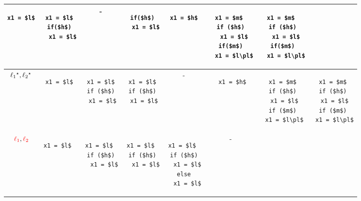 \begin{table*}
\begin{tabular} {|c|c|c|c|c|c|c|c|}
\begin{lstlisting}
x1 = $l$
\end{lstlisting} & 
\begin{lstlisting}
x1 = $l$
if($h$)
  x1 = $l$
\end{lstlisting} & 
- & 
\begin{lstlisting}
if($h$)
  x1 = $l$
\end{lstlisting} & 
\begin{lstlisting}
x1 = $h$
\end{lstlisting} & 
\begin{lstlisting}
x1 = $m$ 
if ($h$)
  x1 = $l$
if($m$)
  x1 = $l\pl$
\end{lstlisting} & 
\begin{lstlisting}
x1 = $m$ 
if ($h$)
  x1 = $l$
if($m$)
  x1 = $l\pl$
\end{lstlisting} \\
\hline
$\ell_1{}^\star, \ell_2{}^\star$ & 
\begin{lstlisting}
x1 = $l$
\end{lstlisting} 
& 
\begin{lstlisting}
x1 = $l$
if ($h$)
 x1 = $l$
\end{lstlisting} 
& 
\begin{lstlisting}
x1 = $l$
if ($h$)
 x1 = $l$
\end{lstlisting} 
& 
-
&
\begin{lstlisting}
 x1 = $h$
\end{lstlisting} 
& 
\begin{lstlisting}
x1 = $m$
if ($h$)
 x1 = $l$
if ($m$)
 x1 = $l\pl$
\end{lstlisting} 
&
\begin{lstlisting}
x1 = $m$
if ($h$)
 x1 = $l$
if ($m$)
 x1 = $l\pl$
\end{lstlisting}  
\\
\hline
$\textcolor{red}{\ell_1}, \textcolor{red}{\ell_2}$ & 
\begin{lstlisting}
x1 = $l$ 
\end{lstlisting}  
& 
\begin{lstlisting}
x1 = $l$ 
if ($h$)
  x1 = $l$
\end{lstlisting}  
& 
\begin{lstlisting}
x1 = $l$ 
if ($h$)
  x1 = $l$
\end{lstlisting}  
& 
\begin{lstlisting}
x1 = $l$ 
if ($h$)
  x1 = $l$
else
  x1 = $l$
\end{lstlisting}  
& 
-
&
\begin{lstlisting}

\end{lstlisting}
\end{tabular}
\end{table*}
